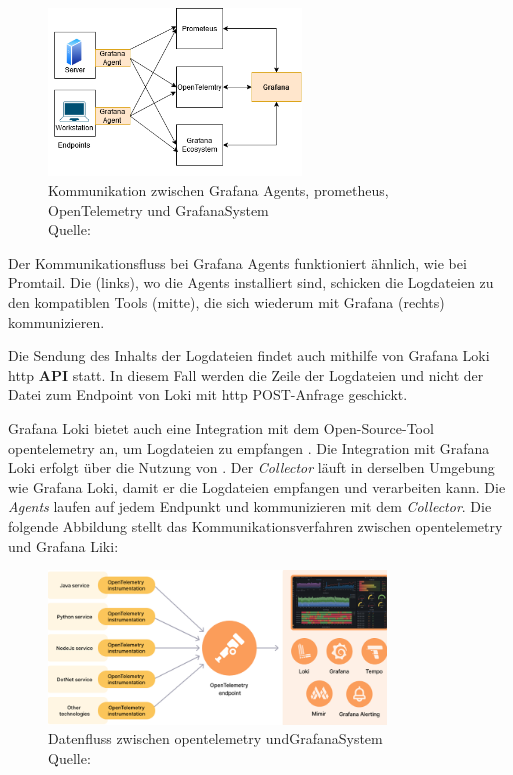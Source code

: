 \begin{figure}[H]
   \centering
   \includegraphics[width=0.6\textwidth]{assets/GrafanaAgents.drawio.png}
   \caption[Kommunikation zwischen Grafana Agents, \gls{prometheus}, OpenTelemetry und \gls{GrafanaSystem}]
   {Kommunikation zwischen Grafana Agents, \gls{prometheus}, OpenTelemetry und \gls{GrafanaSystem}\\Quelle: \citep{Grafana_Agents}}
   \label{fig:GrafAgents}
   \centering
\end{figure}

Der Kommunikationsfluss bei Grafana Agents funktioniert ähnlich, wie bei Promtail. Die  (links), wo die Agents installiert sind, schicken die Logdateien zu den kompatiblen Tools (mitte), die sich wiederum mit Grafana (rechts) kommunizieren.

Die Sendung des Inhalts der Logdateien findet auch mithilfe von Grafana Loki \gls{http} \textbf{\gls{API}} statt. In diesem Fall werden die Zeile der Logdateien und nicht der Datei zum \gls{Endpoint} von Loki mit \gls{http} POST-Anfrage geschickt. 

Grafana Loki bietet auch eine Integration mit dem Open-Source-Tool \gls{opentelemetry} an, um Logdateien zu empfangen \citep{Grafana_opentelemetry}. Die Integration mit Grafana Loki erfolgt über die Nutzung von . Der \textit{Collector} läuft in derselben Umgebung wie Grafana Loki, damit er die Logdateien empfangen und verarbeiten kann. Die \textit{Agents} laufen auf jedem Endpunkt und kommunizieren mit dem \textit{Collector}. Die folgende Abbildung stellt das Kommunikationsverfahren zwischen \gls{opentelemetry} und Grafana Liki:

\begin{figure}[H]
   \centering
   \includegraphics[width=0.8\textwidth]{assets/Grafana_OpenTelemtry.png}
   \caption[Datenfluss zwischen \gls{opentelemetry} und die Tools von \gls{GrafanaSystem}]
   {Datenfluss zwischen \gls{opentelemetry} und\gls{GrafanaSystem}\\Quelle: \citep{Grafana_WhatOpentelemetry}}
   \label{fig:UsingOpenTelemetry}
   \centering
\end{figure}

